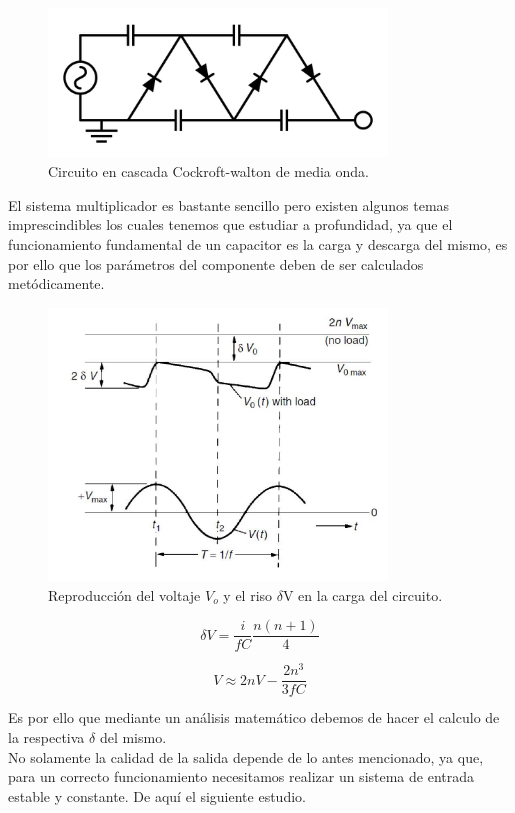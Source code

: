 \begin{figure}[H]
\centering
\includegraphics[width=9cm]{capitulo2/figs/circ.png}
\caption{ Circuito en cascada Cockroft-walton de media onda.}
\end{figure}
El sistema multiplicador es bastante sencillo pero existen algunos temas imprescindibles los cuales tenemos que estudiar a profundidad, ya que el funcionamiento fundamental de un capacitor es la carga y descarga del mismo, es por ello que los parámetros del componente deben de ser calculados metódicamente.

\begin{figure}[H]
\centering
\includegraphics[width=9cm]{capitulo2/figs/riso.png}
\caption{ Reproducción del voltaje $V_{o}$ y el riso $\delta$V en la carga del circuito.}
\end{figure}

\begin{equation}
\delta V=\frac{i}{fC}\frac{n(n+1)}{4}
\end{equation}

\begin{equation}
V\approx 2nV-\frac{2n^{3}}{3fC}
\end{equation}

Es por ello que mediante un análisis matemático debemos de hacer el calculo de la respectiva $\delta$ del mismo.\\
No solamente la calidad de la salida depende de lo antes mencionado, ya que, para un correcto funcionamiento necesitamos realizar un sistema de entrada estable y constante. De aquí el siguiente estudio.
\newpage
